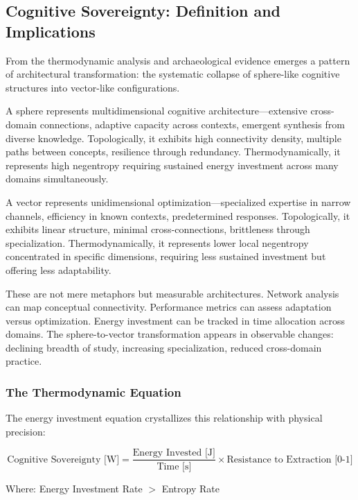 \subsection{Cognitive Sovereignty: Definition and Implications}

From the thermodynamic analysis and archaeological evidence emerges a pattern of architectural transformation: the systematic collapse of sphere-like cognitive structures into vector-like configurations.

A sphere represents multidimensional cognitive architecture---extensive cross-domain connections, adaptive capacity across contexts, emergent synthesis from diverse knowledge. Topologically, it exhibits high connectivity density, multiple paths between concepts, resilience through redundancy. Thermodynamically, it represents high negentropy requiring sustained energy investment across many domains simultaneously.

A vector represents unidimensional optimization---specialized expertise in narrow channels, efficiency in known contexts, predetermined responses. Topologically, it exhibits linear structure, minimal cross-connections, brittleness through specialization. Thermodynamically, it represents lower local negentropy concentrated in specific dimensions, requiring less sustained investment but offering less adaptability.

These are not mere metaphors but measurable architectures. Network analysis can map conceptual connectivity. Performance metrics can assess adaptation versus optimization. Energy investment can be tracked in time allocation across domains. The sphere-to-vector transformation appears in observable changes: declining breadth of study, increasing specialization, reduced cross-domain practice.

\subsubsection{The Thermodynamic Equation}

The energy investment equation crystallizes this relationship with physical precision:

\begin{equation}
\text{Cognitive Sovereignty [W]} = \frac{\text{Energy Invested [J]}}{\text{Time [s]}} \times \text{Resistance to Extraction [0-1]}
\end{equation}

Where: Energy Investment Rate $>$ Entropy Rate

